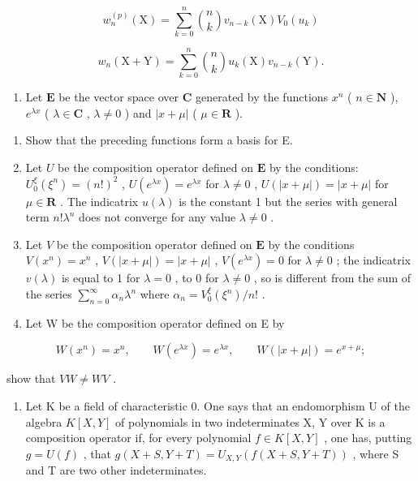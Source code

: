 \[
w _ {n} ^ {(p)} (\mathrm{X}) = \sum_ {k = 0} ^ {n} \binom {n} {k} v _ {n - k} (\mathrm{X}) V _ {0} (u _ {k})
\]

\[
w _ {n} (\mathrm{X} + \mathrm{Y}) = \sum_ {k = 0} ^ {n} \binom {n} {k} u _ {k} (\mathrm{X}) v _ {n - k} (\mathrm{Y}).
\]

\begin{enumerate}
\def\labelenumi{\arabic{enumi})}
\setcounter{enumi}{1}
\tightlist
\item
  Let \(\mathbf{E}\) be the vector space over \(\mathbf{C}\) generated by the functions \(x^n\) ( \(n \in \mathbf{N}\) ), \(e^{\lambda x}\) ( \(\lambda \in \mathbf{C}\) , \(\lambda \neq 0\) ) and \(|x + \mu|\) ( \(\mu \in \mathbf{R}\) ).
\end{enumerate}

\begin{enumerate}
\def\labelenumi{\alph{enumi})}
\item
  Show that the preceding functions form a basis for E.
\item
  Let \(U\) be the composition operator defined on \(\mathbf{E}\) by the conditions: \(U_0^\xi (\xi^n) = (n!)^2\) , \(U(e^{\lambda x}) = e^{\lambda x}\) for \(\lambda \neq 0\) , \(U(|x + \mu|) = |x + \mu|\) for \(\mu \in \mathbf{R}\) . The indicatrix \(u(\lambda)\) is the constant 1 but the series with general term \(n!\lambda^n\) does not converge for any value \(\lambda \neq 0\) .
\item
  Let \(V\) be the composition operator defined on \(\mathbf{E}\) by the conditions \(V(x^n) = x^n\) , \(V(|x + \mu|) = |x + \mu|\) , \(V(e^{\lambda x}) = 0\) for \(\lambda \neq 0\) ; the indicatrix \(v(\lambda)\) is equal to 1 for \(\lambda = 0\) , to 0 for \(\lambda \neq 0\) , so is different from the sum of the series \(\sum_{n=0}^{\infty} \alpha_n \lambda^n\) where \(\alpha_n = V_0^\xi(\xi^n)/n!\) .
\item
  Let W be the composition operator defined on E by
\end{enumerate}

\[
W (x ^ {n}) = x ^ {n}, \qquad W (e ^ {\lambda x}) = e ^ {\lambda x}, \qquad W (| x + \mu |) = e ^ {x + \mu};
\]

show that \(VW \neq WV\) .

\begin{enumerate}
\def\labelenumi{\arabic{enumi})}
\setcounter{enumi}{2}
\tightlist
\item
  Let K be a field of characteristic 0. One says that an endomorphism U of the algebra \(K[X,Y]\) of polynomials in two indeterminates X, Y over K is a composition operator if, for every polynomial \(f \in K[X,Y]\) , one has, putting \(g = U(f)\) , that \(g(X + S, Y + T) = U_{X,Y}(f(X + S, Y + T))\) , where S and T are two other indeterminates.
\end{enumerate}

